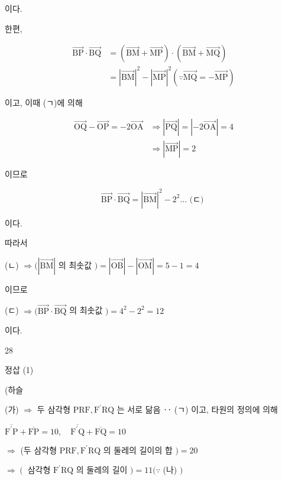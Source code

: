 \documentclass[10pt]{article}
\begin{document}
이다.

한편,

\[
\begin{aligned}
\overrightarrow{\mathrm{BP}} \cdot \overrightarrow{\mathrm{BQ}} & =(\overrightarrow{\mathrm{BM}}+\overrightarrow{\mathrm{MP}}) \cdot(\overrightarrow{\mathrm{BM}}+\overrightarrow{\mathrm{MQ}}) \\
& =|\overrightarrow{\mathrm{BM}}|^{2}-|\overrightarrow{\mathrm{MP}}|^{2}(\because \overrightarrow{\mathrm{MQ}}=-\overrightarrow{\mathrm{MP}})
\end{aligned}
\]

이고, 이때 (ㄱ)에 의해

\[
\begin{aligned}
\overrightarrow{\mathrm{OQ}}-\overrightarrow{\mathrm{OP}}=-2 \overrightarrow{\mathrm{OA}} & \Rightarrow|\overrightarrow{\mathrm{PQ}}|=|-2 \overrightarrow{\mathrm{OA}}|=4 \\
& \Rightarrow|\overrightarrow{\mathrm{MP}}|=2
\end{aligned}
\]

이므로

\[
\overrightarrow{\mathrm{BP}} \cdot \overrightarrow{\mathrm{BQ}}=|\overrightarrow{\mathrm{BM}}|^{2}-2^{2} \ldots \text { (ㄷ) }
\]

이다.

따라서

(ㄴ) \(\Rightarrow(|\overrightarrow{\mathrm{BM}}|\) 의 최솟값 \()=|\overrightarrow{\mathrm{OB}}|-|\overrightarrow{\mathrm{OM}}|=5-1=4\)

이므로

(ㄷ) \(\Rightarrow(\overrightarrow{\mathrm{BP}} \cdot \overrightarrow{\mathrm{BQ}}\) 의 최솟값 \()=4^{2}-2^{2}=12\)

이다.

28

정삽 (1)

(하슬

(가) \(\Rightarrow\) 두 삼각형 \(\mathrm{PRF}, \mathrm{F}^{\prime} \mathrm{RQ}\) 는 서로 닮음 ‥ (ㄱ) 이고, 타원의 정의에 의해

\(\overline{\mathrm{F}^{\prime} \mathrm{P}}+\overline{\mathrm{FP}}=10, \quad \overline{\mathrm{F}^{\prime} \mathrm{Q}}+\overline{\mathrm{FQ}}=10\)

\(\Rightarrow\) (두 삼각형 \(\mathrm{PRF}, \mathrm{F}^{\prime} \mathrm{RQ}\) 의 둘레의 길이의 합 \()=20\)

\(\Rightarrow\left(\right.\) 삼각형 \(\mathrm{F}^{\prime} \mathrm{RQ}\) 의 둘레의 길이 \()=11(\because\) (나) \()\)
\end{document}
